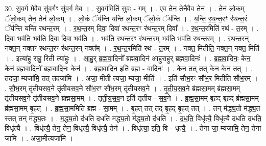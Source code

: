 \documentclass[17pt]{extarticle}
\begin{document}
30. सु॒व॒र्ग मे॒वैव सु॑व॒र्गꣳ सु॑व॒र्ग मे॒व । . सु॒व॒र्गमिति॑ सुवः - गम् । . ए॒व तेन॒ तेनै॒वैव तेन॑ । . तेन॑ लो॒कम् ॅलो॒कम् तेन॒ तेन॑ लो॒कम् । . लो॒कं ॅय॑न्ति यन्ति लो॒कम् ॅलो॒कं ॅय॑न्ति । . य॒न्ति॒ र॒थ॒न्त॒रꣳ र॑थन्त॒रं ॅय॑न्ति यन्ति रथन्त॒रम् । . र॒थ॒न्त॒रम् दिवा॒ दिवा॑ रथन्त॒रꣳ र॑थन्त॒रम् दिवा᳚ । . र॒थ॒न्त॒रमिति॑ रथं - त॒रम् । . दिवा॒ भव॑ति॒ भव॑ति॒ दिवा॒ दिवा॒ भव॑ति । . भव॑ति रथन्त॒रꣳ र॑थन्त॒रम् भव॑ति॒ भव॑ति रथन्त॒रम् । . र॒थ॒न्त॒रन् नक्त॒न् नक्तꣳ॑ रथन्त॒रꣳ र॑थन्त॒रन् नक्त᳚म् । . र॒थ॒न्त॒रमिति॑ रथं - त॒रम् । . नक्त॒ मितीति॒ नक्त॒न् नक्त॒ मिति॑ । . इत्या॑हु राहु॒ रिती त्या॑हुः । . आ॒हु॒र् ब्र॒ह्म॒वा॒दिनो᳚ ब्रह्मवा॒दिन॑ आहुराहुर् ब्रह्मवा॒दिनः॑ । . ब्र॒ह्म॒वा॒दिनः॒ केन॒ केन॑ ब्रह्मवा॒दिनो᳚ ब्रह्मवा॒दिनः॒ केन॑ । . ब्र॒ह्म॒वा॒दिन॒ इति॑ ब्रह्म - वा॒दिनः॑ । . केन॒ तत् तत् केन॒ केन॒ तत् । . तदजा॒ म्यजा॑मि॒ तत् तदजा॑मि । . अजा॒ मीती त्यजा॒ म्यजा॒ मीति॑ । . इति॑ सौभ॒रꣳ सौ॑भ॒र मितीति॑ सौभ॒रम् । . सौ॒भ॒रम् तृ॑तीयसव॒ने तृ॑तीयसव॒ने सौ॑भ॒रꣳ सौ॑भ॒रम् तृ॑तीयसव॒ने । . तृ॒ती॒य॒स॒व॒ने ब्र॑ह्मसा॒मम् ब्र॑ह्मसा॒मम् तृ॑तीयसव॒ने तृ॑तीयसव॒ने ब्र॑ह्मसा॒मम् । . तृ॒ती॒य॒स॒व॒न इति॑ तृतीय - स॒व॒ने । . ब्र॒ह्म॒सा॒मम् बृ॒हद् बृ॒हद् ब्र॑ह्मसा॒मम् ब्र॑ह्मसा॒मम् बृ॒हत् । . ब्र॒ह्म॒सा॒ममिति॑ ब्रह्म - सा॒मम् । . बृ॒हत् तत् तद् बृ॒हद् बृ॒हत् तत् । . तन् म॑द्ध्य॒तो म॑द्ध्य॒त स्तत् तन् म॑द्ध्य॒तः । . म॒द्ध्य॒तो द॑धति दधति मद्ध्य॒तो म॑द्ध्य॒तो द॑धति । . द॒ध॒ति॒ विधृ॑त्यै॒ विधृ॑त्यै दधति दधति॒ विधृ॑त्यै । . विधृ॑त्यै॒ तेन॒ तेन॒ विधृ॑त्यै॒ विधृ॑त्यै॒ तेन॑ । . विधृ॑त्या॒ इति॒ वि - धृ॒त्यै॒ । . तेना जा॒ म्यजा॑मि॒ तेन॒ तेना जा॑मि । . अजा॒मीत्यजा॑मि । \newline
\end{document}
